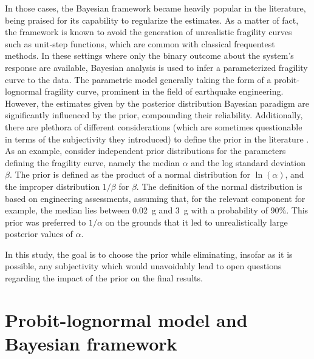 In those cases, the Bayesian framework became heavily popular in the literature, being praised for its capability to regularize the estimates. As a matter of fact, the framework is known to
avoid the generation of unrealistic fragility curves such as unit-step functions, which are common with
 classical frequentest methods.  %
In these settings where only the binary outcome about the system's response are available, Bayesian analysis is used to infer a parameterized fragility curve to the data. The
parametric model generally taking the form of a probit-lognormal fragility curve, prominent in the field of earthquake engineering.
%
%
However, the estimates given by the posterior distribution Bayesian paradigm %
are significantly influenced by the prior, 
compounding their reliability.
Additionally, there are plethora of different considerations (which are sometimes questionable in terms of the subjectivity they introduced)  to define the prior in the literature .
As an example, \citet{straub_improved_2008}
consider independent prior distributions for the parameters defining the fragility curve, namely the median $\alpha$ and the log standard deviation $\beta$. The prior is defined as the product of a normal distribution for $\ln(\alpha)$, and the improper distribution $1/\beta$ for $\beta$. The definition of the normal distribution is based on engineering assessments, assuming that, for the relevant component for example, the median lies between 0.02~g and 3~g with a probability of 90\%. This prior was preferred to $1/\alpha$ on the grounds that it led to unrealistically large posterior values of $\alpha$.



In this study, the goal is to choose the prior while eliminating, insofar as it is possible, any subjectivity which would unavoidably lead to open questions regarding the impact of the prior on the final results. %





\section{Probit-lognormal model and Bayesian framework}

